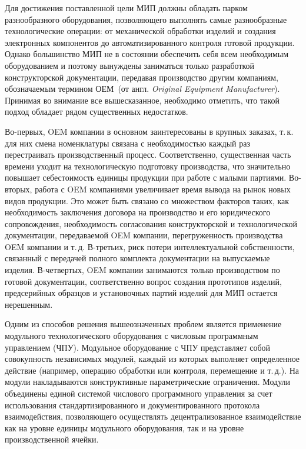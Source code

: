 Для достижения поставленной цели МИП должны обладать парком разнообразного оборудования, позволяющего выполнять самые разнообразные технологические операции: от механической обработки изделий и создания электронных компонентов до автоматизированного контроля готовой продукции. Однако большинство МИП не в состоянии обеспечить себя всем необходимым оборудованием и поэтому вынуждены заниматься только разработкой конструкторской документации, передавая производство другим компаниям, обозначаемым термином ОЕМ~(от англ. \textit{Original Equipment Manufacturer}). Принимая во внимание все вышесказанное, необходимо отметить, что такой подход обладает рядом существенных недостатков.

Во-первых, OEM компании в основном заинтересованы в крупных заказах, т.\,к. для них смена номенклатуры связана с необходимостью каждый раз перестраивать производственный процесс. Соответственно, существенная часть времени уходит на технологическую подготовку производства, что значительно повышает себестоимость единицы продукции при работе с малыми партиями. Во-вторых, работа с OEM компаниями увеличивает время вывода на рынок новых видов продукции. Это может быть связано со множеством факторов таких, как необходимость заключения договора на производство и его юридического сопровождения, необходимость согласования конструкторской и технологической документации, передаваемой OEM компании, перегруженность производства OEM компании и т.\,д. В-третьих, риск потери интеллектуальной собственности, связанный с передачей полного комплекта документации на выпускаемые изделия. В-четвертых, OEM компании занимаются только производством по готовой документации, соответственно вопрос создания прототипов изделий, предсерийных образцов и установочных партий изделий для МИП остается нерешенным.

Одним из способов решения вышеозначенных проблем является применение модульного технологического оборудования с числовым программным управлением (ЧПУ). Модульное оборудование с ЧПУ представляет собой совокупность независимых модулей, каждый из которых выполняет определенное действие (например, операцию обработки или контроля, перемещение и т.\,д.). На модули накладываются конструктивные параметрические ограничения. Модули объединены единой системой числового программного управления за счет использования стандартизированного и документированного протокола взаимодействия, позволяющего осуществлять децентрализованное взаимодействие как на уровне единицы модульного оборудования, так и на уровне производственной ячейки. 

